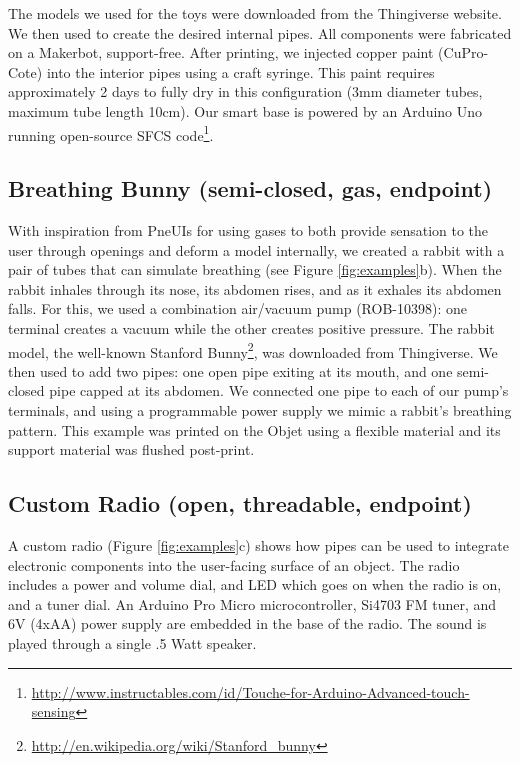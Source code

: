 The models we used for the toys were downloaded from the  Thingiverse website.  We then used \systemname to create the desired internal pipes. All components were fabricated on a Makerbot, support-free.  After printing, we injected copper paint (CuPro-Cote) into the interior pipes using a craft syringe.  This paint requires approximately 2 days to fully dry in this configuration (3mm diameter tubes, maximum tube length 10cm).  Our smart base is powered by an Arduino Uno running open-source SFCS code\footnote{\url{http://www.instructables.com/id/Touche-for-Arduino-Advanced-touch-sensing}}. 

\subsection{Breathing Bunny (semi-closed, gas, endpoint)}

With inspiration from PneUIs \cite{Yao-pneui} for using gases to both provide sensation to the user through openings and deform a model internally, we created a rabbit with a pair of tubes that can simulate breathing (see Figure \ref{fig:examples}b).  When the rabbit inhales through its nose, its abdomen rises, and as it exhales its abdomen falls.  For this, we used a combination air/vacuum pump (ROB-10398): one terminal creates a vacuum while the other creates positive pressure.  
The rabbit model, the well-known Stanford Bunny\footnote{\url{http://en.wikipedia.org/wiki/Stanford_bunny}}, was downloaded from Thingiverse. We then used \systemname to add two pipes: one open pipe exiting at its mouth, and one semi-closed pipe capped at its abdomen.  We connected one pipe to each of our pump's terminals, and using a programmable power supply we mimic a rabbit's breathing pattern.  This example was printed on the Objet using a flexible material and its support material was flushed post-print.

\subsection{Custom Radio (open, threadable, endpoint)}
A custom radio (Figure \ref{fig:examples}c) shows how pipes can be used to integrate electronic components into the user-facing surface of an object. The radio includes a power and volume dial, and LED which goes on when the radio is on, and a tuner dial. An Arduino Pro Micro microcontroller, Si4703 FM tuner, and 6V (4xAA) power supply are embedded in the base of the radio. The sound is played through a single .5 Watt speaker.

